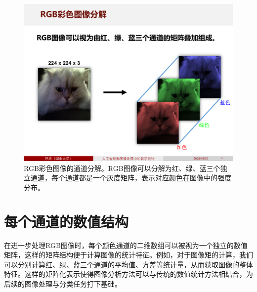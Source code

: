 \documentclass[
    report,     %
    oneside,    %
    UTF8,       %
    zihao=-4    %
]{config} %
\begin{document}
\begin{figure}[H] %
    \centering %
    \includegraphics[width=\linewidth]{figures/图像数据的处理方式/2.PNG}
    \caption[RGB彩色图像的通道分解]{RGB彩色图像的通道分解。RGB图像可以分解为红、绿、蓝三个独立通道，每个通道都是一个灰度矩阵，表示对应颜色在图像中的强度分布。}
\end{figure}
\vspace{-0.7em}

\section{每个通道的数值结构}

在进一步处理RGB图像时，每个颜色通道的二维数组可以被视为一个独立的数值矩阵，这样的矩阵结构便于计算图像的统计特征。例如，对于图像矩的计算，我们可以分别计算红、绿、蓝三个通道的平均值、方差等统计量，从而获取图像的整体特征。这样的矩阵化表示使得图像分析方法可以与传统的数值统计方法相结合，为后续的图像处理与分类任务打下基础。
\end{document}
